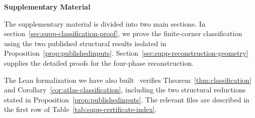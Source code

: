 \makeatletter
\newcommand{\LLM@suppsectionnumber}{}
\newcommand{\LLM@suppsubsectionnumber}{}
\newcommand{\LLM@sectionnumberline}[1]{%
  \xdef\LLM@suppsectionnumber{#1}%
  \hb@xt@\@tempdima{\bfseries #1\hfil}}
\newcommand{\LLM@subsectionnumberline}[1]{%
  \xdef\LLM@suppsubsectionnumber{\LLM@suppsectionnumber.#1}%
  \hb@xt@\@tempdima{\LLM@suppsubsectionnumber\hfil}}
\newcommand{\LLM@subsubsectionnumberline}[1]{%
  \hb@xt@\@tempdima{\LLM@suppsubsectionnumber.#1\hfil}}
\newcommand{\supplementaltableofcontents}{%
  \begin{center}\large\bfseries{Supplemental contents}\end{center}\vspace{0.25em}%
  \begingroup
  \setcounter{tocdepth}{3}%
  \setlength{\parskip}{0pt}%
  \renewcommand*\l@section[2]{%
    \addpenalty{-\@highpenalty}\addvspace{0.45em}%
    \begingroup\bfseries
    \let\numberline\LLM@sectionnumberline
    \@dottedtocline{1}{0em}{3.2em}{##1}{##2}%
    \endgroup}%
  \renewcommand*\l@subsection[2]{%
    \begingroup
    \let\numberline\LLM@subsectionnumberline
    \@dottedtocline{2}{1.5em}{4.2em}{##1}{##2}%
    \endgroup}%
  \renewcommand*\l@subsubsection[2]{%
    \begingroup\itshape
    \let\numberline\LLM@subsubsectionnumberline
    \@dottedtocline{3}{3.5em}{5.0em}{##1}{##2}%
    \endgroup}%
  \@starttoc{stoc}%
  \endgroup}
\let\LLM@addcontentsline\addcontentsline
\renewcommand{\addcontentsline}[3]{%
  \def\LLM@target{#1}%
  \def\LLM@toc{toc}%
  \ifx\LLM@target\LLM@toc
    \LLM@addcontentsline{stoc}{#2}{#3}%
  \else
    \LLM@addcontentsline{#1}{#2}{#3}%
  \fi}
\makeatother
\begin{center}
\large\bfseries Supplementary Material
\end{center}
\newcommand{\subproofheading}[1]{%
  \par\medskip\noindent\textbf{#1}\par\smallskip}

{The supplementary material is divided into two main sections. In section~\ref{sec:supp-classification-proof}, we prove the finite-corner classification using the two published structural results isolated in Proposition~\ref{prop:publishedinputs}. Section~\ref{sec:supp-reconstruction-geometry} supplies the detailed proofs for the four-phase reconstruction.}

The Lean formalization we have also built~\cite{CardenesWuttig2026HadamardRepository} verifies Theorem~\ref{thm:classification} and
Corollary~\ref{cor:atlas-classification}, including the two structural
reductions stated in Proposition~\ref{prop:publishedinputs}. The relevant files are described in the first row of Table~\ref{tab:supp-certificate-index}.

